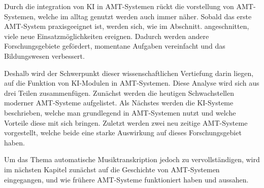 Durch die integration von KI in AMT-Systemen rückt die vorstellung von AMT-Systemen,
welche im alltag genutzt werden auch immer näher.
Sobald das erste AMT-System praxisgeeignet ist, werden sich, wie im Abschnitt. angeschnitten,
viele neue Einsatzmöglichkeiten ereignen.
Dadurch werden andere Forschungsgebiete gefördert, momentane Aufgaben vereinfacht und das Bildungswesen verbessert.

Deshalb wird der Schwerpunkt dieser wissenschaftlichen Vertiefung darin liegen,
auf die Funktion von KI-Modulen in AMT-Systemen.
Diese Analyse wird sich aus drei Teilen zusammenfügen.
Zunächst werden die heutigen Schwachstellen moderner AMT-Systeme aufgelistet.
Als Nächstes werden die KI-Systeme beschrieben,
welche man grundlegend in AMT-Systemen nutzt und welche Vorteile diese mit sich bringen.
Zuletzt werden zwei neu zeitige AMT-Systeme vorgestellt,
welche beide eine starke Auswirkung auf dieses Forschungsgebiet haben.

Um das Thema automatische Musiktranskription jedoch zu vervollständigen,
wird im nächsten Kapitel zunächst auf die Geschichte von AMT-Systemen eingegangen,
und wie frühere AMT-Systeme funktioniert haben und aussahen.